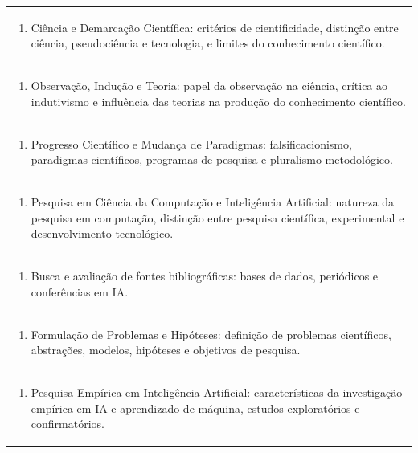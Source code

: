 \documentclass[11pt]{article}
\begin{document}
\begin{center}
\begin{longtable}{|p{4cm}|p{4cm}|p{4cm}|p{4cm}|}
\multicolumn{4}{|p{\dimexpr 16cm + 6\tabcolsep\relax}|}{\begin{enumerate}[start=1]\item Ciência e Demarcação Científica: critérios de cientificidade, distinção entre ciência, pseudociência e tecnologia, e limites do conhecimento científico.\end{enumerate}}\\
\multicolumn{4}{|p{\dimexpr 16cm + 6\tabcolsep\relax}|}{\begin{enumerate}[start=2]\item Observação, Indução e Teoria: papel da observação na ciência, crítica ao indutivismo e influência das teorias na produção do conhecimento científico.\end{enumerate}}\\
\multicolumn{4}{|p{\dimexpr 16cm + 6\tabcolsep\relax}|}{\begin{enumerate}[start=3]\item Progresso Científico e Mudança de Paradigmas: falsificacionismo, paradigmas científicos, programas de pesquisa e pluralismo metodológico.\end{enumerate}}\\
\multicolumn{4}{|p{\dimexpr 16cm + 6\tabcolsep\relax}|}{\begin{enumerate}[start=4]\item Pesquisa em Ciência da Computação e Inteligência Artificial: natureza da pesquisa em computação, distinção entre pesquisa científica, experimental e desenvolvimento tecnológico.\end{enumerate}}\\
\multicolumn{4}{|p{\dimexpr 16cm + 6\tabcolsep\relax}|}{\begin{enumerate}[start=5]\item Busca e avaliação de fontes bibliográficas: bases de dados, periódicos e conferências em IA.\end{enumerate}}\\
\multicolumn{4}{|p{\dimexpr 16cm + 6\tabcolsep\relax}|}{\begin{enumerate}[start=6]\item Formulação de Problemas e Hipóteses: definição de problemas científicos, abstrações, modelos, hipóteses e objetivos de pesquisa.\end{enumerate}}\\
\multicolumn{4}{|p{\dimexpr 16cm + 6\tabcolsep\relax}|}{\begin{enumerate}[start=7]\item Pesquisa Empírica em Inteligência Artificial: características da investigação empírica em IA e aprendizado de máquina, estudos exploratórios e confirmatórios.\end{enumerate}}\\

\end{longtable}
\end{center}
\end{document}

